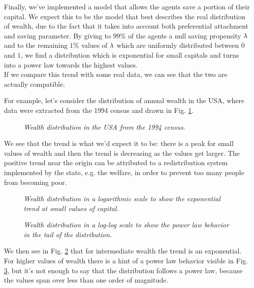 Finally, we've implemented a model that allows the agents save a portion of their capital.
We expect this to be the model that best describes the real distribution of wealth, due to the fact that it takes into account both preferential attachment and saving parameter.
By giving to $99 \%$ of the agents a null saving propensity $\lambda$ and to the remaining $1 \%$ values of $\lambda$ which are uniformly distributed between $0$ and $1$, we find a distribution which is exponential for small capitals and turns into a power law towards the highest values. \\
If we compare this trend with some real data, we can see that the two are actually compatible.

For example, let's consider the distribution of annual wealth in the USA, where data were extracted from the 1994 census and drawn in Fig. \ref{fig:gloabl_realData}.
\begin{figure}[H]
    \centering
    \scalebox{.7}{}
    \caption{\emph{Wealth distribution in the USA from the 1994 census.}}
    \label{fig:gloabl_realData}
\end{figure}
We see that the trend is what we'd expect it to be: there is a peak for small values of wealth and then the trend is decreasing as the values get larger.
The positive trend near the origin can be attributed to a redistribution system implemented by the state, e.g. the welfare, in order to prevent too many people from becoming poor. \\
\begin{figure}[H]
    \centering
    \scalebox{.7}{}
    \caption{\emph{Wealth distribution in a logarithmic scale to show the exponential trend at small values of capital.}}
    \label{fig:real_head}
\end{figure}
\begin{figure}[H]
    \centering
    \scalebox{.7}{}
    \caption{\emph{Wealth distribution in a log-log scale to show the power law behavior in the tail of the distribution.}}
    \label{fig:real_tail}
\end{figure}
We then see in Fig. \ref{fig:real_head} that for intermediate wealth the trend is an exponential.
For higher values of wealth there is a hint of a power law behavior visible in Fig. \ref{fig:real_tail}, but it's not enough to say that the distribution follows a power law, because the values span over less than one order of magnitude.
